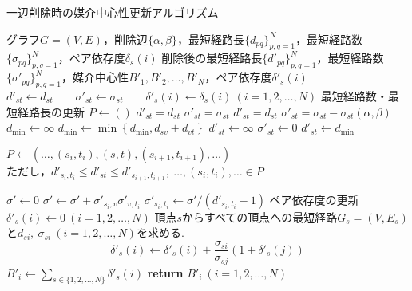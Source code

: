 \begin{algorithm}[H]
  \caption{一辺削除時の媒介中心性更新アルゴリズム}
  \label{algo:update-bc-on-delete-old}
  \begin{algorithmic}[1]
    \Require グラフ$G=(V,E)$，削除辺$\{\alpha,\beta\}$，最短経路長$\{d_{pq}\}_{p,q=1}^N$，最短経路数$\{\sigma_{pq}\}_{p,q=1}^N$，ペア依存度$\delta_s(i)$
    \Ensure 削除後の最短経路長$\{d'_{pq}\}_{p,q=1}^N$，最短経路数$\{\sigma'_{pq}\}_{p,q=1}^N$，媒介中心性$B'_1,B'_2,\ldots,B'_N$，ペア依存度$\delta'_s(i)$
    \State $d'_{st}\gets d_{st}\qquad\sigma'_{st}\gets\sigma_{st}\qquad\delta'_s(i)\gets\delta_s(i)\ (i=1,2,\ldots,N)$
    \Else
    \State\Comment 最短経路数・最短経路長の更新
    \State $P\gets()$
    \State $d'_{st}=d_{st}$
    \State $\sigma'_{st}=\sigma_{st}$
    \State $d'_{st}=d_{st}$
    \State $\sigma'_{st}=\sigma_{st}-\sigma_{st}(\alpha,\beta)$
    \State $d_{\min}\gets \infty$
    \State $d_{\min}\gets\min\left\{d_{\min},d_{sv}+d_{vt}\right\}$
    \EndFor
    \State $d'_{st}\gets\infty$
    \State $\sigma'_{st}\gets0$
    \Else
    \State $d'_{st}\gets d_{\min}$
    \State \parbox[t]{\linewidth}{
      $P\gets(\ldots,(s_i,t_i),(s,t),(s_{i+1},t_{i+1}),\ldots)$ \\
      ただし，$d'_{s_i,t_i}\leq d'_{st}\leq d'_{s_{i+1},t_{i+1}},\ \ldots,(s_i,t_i),\ldots\in P$
    }
    \EndIf
    \EndIf
    \EndFor
    \State $\sigma'\gets0$
    \State $\sigma'\gets\sigma'+\sigma'_{s_i,v}\sigma'_{v,t_i}$
    \EndFor
    \State $\sigma'_{s_i,t_i}\gets\sigma'/(d'_{s_i,t_i}-1)$
    \EndFor
    \State\Comment ペア依存度の更新
    \State $\delta'_s(i)\gets0\ (i=1,2,\ldots,N)$
    \State 頂点$s$からすべての頂点への最短経路$G_s=(V,E_s)$と$d_{si},\ \sigma_{si}\ (i=1,2,\ldots,N)$を求める. 
    \State \begin{equation*} \delta'_s(i)\gets\delta'_s(i)+\frac{\sigma_{si}}{\sigma_{sj}}(1+\delta'_s(j)) \end{equation*}
    \EndFor
    \EndIf
    \EndFor
    \State $B'_i\gets\sum_{s\in\{1,2,\ldots,N\}}\delta'_s(i)$
    \State \textbf{return} $B'_i\ (i=1,2,\ldots,N)$
  \end{algorithmic}
\end{algorithm}

